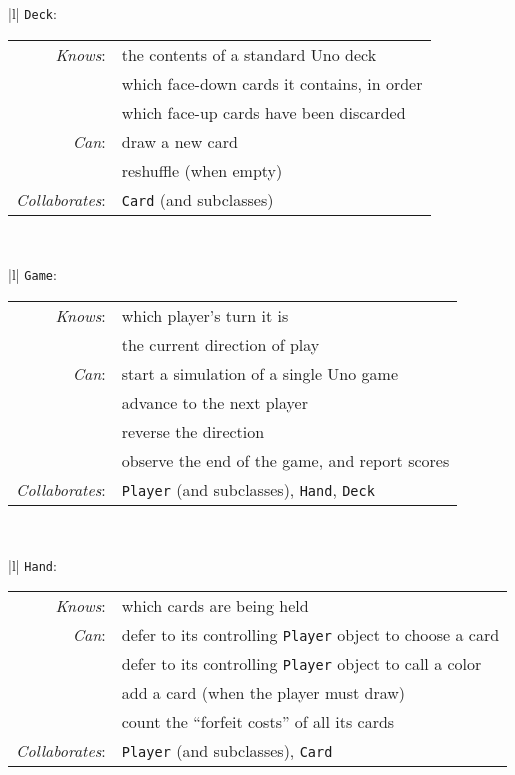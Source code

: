 \begin{center}
\begin{tabular}{|l|}
\hline
\texttt{Deck}:\\
\hline
\begin{tabular}{rl}
\textit{Knows}: & the contents of a standard Uno deck \\
& which face-down cards it contains, in order \\
& which face-up cards have been discarded \\
\textit{Can}: & draw a new card \\
& reshuffle (when empty) \\
\hline
\textit{Collaborates}: & \texttt{Card} (and subclasses)\\
\end{tabular}\\
\hline
\end{tabular}
\end{center}

\begin{center}
\begin{tabular}{|l|}
\hline
\texttt{Game}:\\
\hline
\begin{tabular}{rl}
\textit{Knows}: & which player's turn it is \\
& the current direction of play \\
\textit{Can}: & start a simulation of a single Uno game \\
& advance to the next player \\
& reverse the direction \\
& observe the end of the game, and report scores \\
\hline
\textit{Collaborates}: & \texttt{Player} (and subclasses), \texttt{Hand},
\texttt{Deck} \\
\end{tabular}\\
\hline
\end{tabular}
\end{center}

\begin{center}
\begin{tabular}{|l|}
\hline
\texttt{Hand}:\\
\hline
\begin{tabular}{rl}
\textit{Knows}: & which cards are being held \\
\textit{Can}: & defer to its controlling \texttt{Player} object to choose a card \\
& defer to its controlling \texttt{Player} object to call a color \\
& add a card (when the player must draw) \\
& count the ``forfeit costs'' of all its cards \\
\hline
\textit{Collaborates}: & \texttt{Player} (and subclasses), \texttt{Card}\\
\end{tabular}\\
\hline
\end{tabular}
\end{center}

